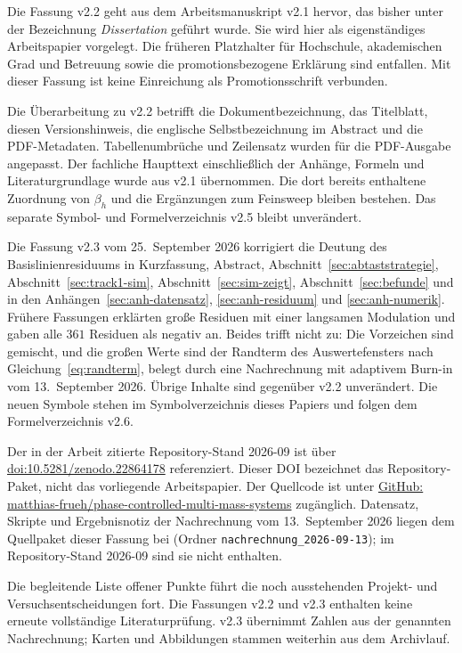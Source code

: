 \documentclass[12pt,a4paper]{report}
\begin{document}
Die Fassung v2.2 geht aus dem Arbeitsmanuskript v2.1 hervor, das bisher
unter der Bezeichnung \emph{Dissertation} geführt wurde. Sie wird hier
als eigenständiges Arbeitspapier vorgelegt. Die früheren Platzhalter für
Hochschule, akademischen Grad und Betreuung sowie die promotionsbezogene
Erklärung sind entfallen. Mit dieser Fassung ist keine Einreichung als
Promotionsschrift verbunden.

Die Überarbeitung zu v2.2 betrifft die Dokumentbezeichnung, das Titelblatt,
diesen Versionshinweis, die englische Selbstbezeichnung im Abstract und
die PDF-Metadaten. Tabellenumbrüche und Zeilensatz wurden für die
PDF-Ausgabe angepasst. Der fachliche Haupttext einschließlich der Anhänge,
Formeln und Literaturgrundlage wurde aus v2.1 übernommen. Die dort
bereits enthaltene Zuordnung von $\beta_h$ und die Ergänzungen zum
Feinsweep bleiben bestehen. Das separate Symbol- und Formelverzeichnis
v2.5 bleibt unverändert.

Die Fassung v2.3 vom 25.~September 2026 korrigiert die Deutung des
Basislinienresiduums in Kurzfassung, Abstract,
Abschnitt~\ref{sec:abtaststrategie}, Abschnitt~\ref{sec:track1-sim},
Abschnitt~\ref{sec:sim-zeigt}, Abschnitt~\ref{sec:befunde} und in den
Anhängen~\ref{sec:anh-datensatz}, \ref{sec:anh-residuum} und
\ref{sec:anh-numerik}. Frühere Fassungen erklärten große Residuen mit
einer langsamen Modulation und gaben alle $361$ Residuen als negativ an.
Beides trifft nicht zu: Die Vorzeichen sind gemischt, und die großen
Werte sind der Randterm des Auswertefensters nach
Gleichung~\eqref{eq:randterm}, belegt durch eine Nachrechnung mit
adaptivem Burn-in vom 13.~September 2026. Übrige Inhalte sind gegenüber
v2.2 unverändert. Die neuen Symbole stehen im Symbolverzeichnis dieses Papiers und folgen
dem Formelverzeichnis v2.6.

Der in der Arbeit zitierte Repository-Stand 2026-09 ist über
\href{https://doi.org/10.5281/zenodo.22864178}{doi:10.5281/zenodo.22864178}
referenziert. Dieser DOI bezeichnet das Repository-Paket, nicht das
vorliegende Arbeitspapier. Der Quellcode ist unter
\href{https://github.com/matthias-frueh/phase-controlled-multi-mass-systems}{GitHub: matthias-frueh/phase-controlled-multi-mass-systems}
zugänglich. Datensatz, Skripte und Ergebnisnotiz der Nachrechnung vom
13.~September 2026 liegen dem Quellpaket dieser Fassung bei (Ordner
\texttt{nachrechnung\_2026-09-13}); im Repository-Stand 2026-09 sind sie
nicht enthalten.

Die begleitende Liste offener Punkte führt die noch ausstehenden
Projekt- und Versuchsentscheidungen fort. Die Fassungen v2.2 und v2.3 enthalten keine erneute vollständige
Literaturprüfung. v2.3 übernimmt Zahlen aus der genannten Nachrechnung;
Karten und Abbildungen stammen weiterhin aus dem Archivlauf.
\end{document}
